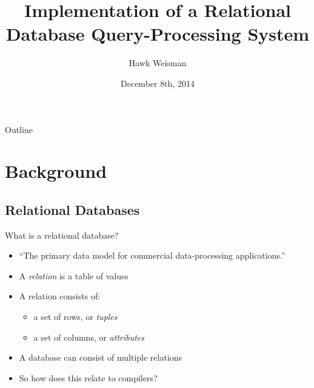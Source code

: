 \documentclass{beamer}
\title{Implementation of a Relational Database Query-Processing System}
\author{Hawk Weisman}
\institute[Allegheny College] %
{Department of Computer Science\\Allegheny College
}
\date{December 8th, 2014}
\begin{document}
\begin{frame}
  \titlepage
\end{frame}

\begin{frame}{Outline}
  \tableofcontents
\end{frame}





\section{Background}

\subsection{Relational Databases}

\begin{frame}{What is a relational database?}

  \begin{itemize}
  \item ``The primary data model for commercial data-processing applications.''~\cite{silberschatz2010database} \pause
  \item A {\it relation} is a table of values~\cite{silberschatz2010database,garcia2000database} \pause
  \item A relation consists of: \pause
  \begin{itemize}
    \item a set of rows, or {\it tuples}~\cite{silberschatz2010database,garcia2000database} \pause
     \item a set of columns, or {\it attributes}~\cite{silberschatz2010database,garcia2000database} \pause
  \end{itemize} 
  \item A database can consist of multiple relations~\cite{silberschatz2010database,garcia2000database}
  \item So how does this relate to compilers?
  \end{itemize}
\end{frame}
\end{document}

